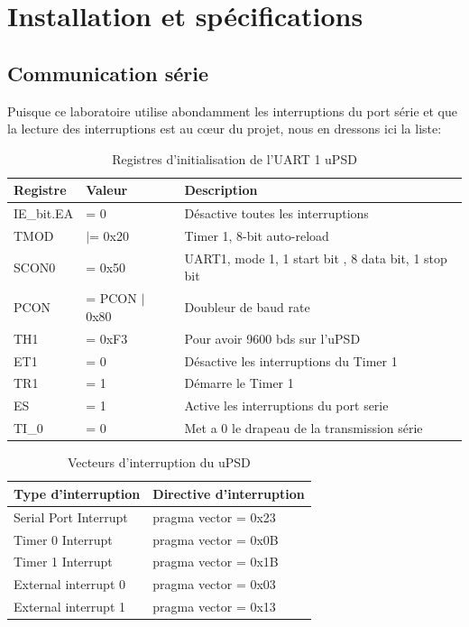 \documentclass[10pt,a4paper,final]{article}
\begin{document}
\section{Installation et spécifications}

\subsection{Communication série}
Puisque ce laboratoire utilise abondamment les interruptions du port série et que la lecture des interruptions est au cœur du projet, nous en dressons ici la liste:


\begin{table}[!ht]
\centering
\caption{Registres d'initialisation de l'UART 1 uPSD}
\begin{tabular}{|l|l|l|}
\hline 
\textbf{Registre} & \textbf{Valeur} & \textbf{Description} \\ 
\hline 
IE\_bit.EA & = 0 & Désactive toutes les interruptions \\ 
\hline 
TMOD  & $\mid$= 0x20 & Timer 1, 8-bit auto-reload \\ 
\hline 
SCON0 & = 0x50 & UART1, mode 1, 1 start bit , 8 data bit, 1 stop bit  \\ 
\hline 
PCON & = PCON $\mid$ 0x80 & Doubleur de baud rate \\ 
\hline 
TH1 & = 0xF3 & Pour avoir 9600 bds sur l'uPSD \\ 
\hline 
ET1 & = 0 & Désactive les interruptions du Timer 1 \\ 
\hline 
TR1 & = 1 & Démarre le Timer 1 \\ 
\hline 
ES & = 1 & Active les interruptions du port serie\\
\hline
TI\_0 & = 0 &  Met a 0 le drapeau de la transmission série \\ 
\hline 
\end{tabular} 
\label{tab:testtab1}
\end{table}

\begin{table}[!ht]
\centering
\caption{Vecteurs d'interruption du uPSD}
\begin{tabular}{|l|l|}
\hline 
\textbf{Type d'interruption} & \textbf{Directive d'interruption}  \\ 
\hline 
Serial Port Interrupt & pragma vector = 0x23 \\ 
\hline 
Timer 0 Interrupt & pragma vector = 0x0B \\ 
\hline 
Timer 1 Interrupt & pragma vector = 0x1B \\ 
\hline 
External interrupt 0 & pragma vector = 0x03 \\ 
\hline 
External interrupt 1 & pragma vector = 0x13 \\ 
\hline 
\end{tabular} 

\label{tab:testtab1}
\end{table}
\end{document}
